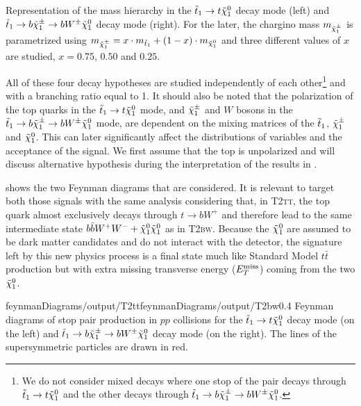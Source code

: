                  {Representation of the mass hierarchy in the $\tilde{t}_1 \rightarrow t
                 \tilde{\chi}_1^0$ decay mode (left) and $\tilde{t}_1 \rightarrow b
                 \tilde{\chi}_1^\pm \rightarrow b W^{\pm} \tilde{\chi}_1^0 $ decay mode (right).
                 For the later, the chargino mass $m_{\tilde{\chi}_1^\pm}$ is
                 parametrized using $m_{\tilde{\chi}_1^\pm} = x \cdot m_{\tilde{t}_1}
                 + (1 - x) \cdot m_{\tilde{\chi}_1^0}$ and three different values of $x$
                 are studied, $x = 0.75$, $0.50$ and $0.25$.}

    All of these four decay hypotheses are studied independently
    of each other\footnote{We do not consider mixed decays where one stop of the pair
    decays through $\tilde{t}_1 \rightarrow t \tilde{\chi}_1^0$ and the other decays through
    $\tilde{t}_1 \rightarrow b \tilde{\chi}_1^\pm \rightarrow b W^{\pm} \tilde{\chi}_1^0$.} and with a
    branching ratio equal to 1. It should also be noted that the polarization of the
    top quarks in the $\tilde{t}_1 \rightarrow t \tilde{\chi}_1^0$ mode, and $\tilde{\chi}_1^\pm$ and
    $W$ bosons in the $\tilde{t}_1 \rightarrow b \tilde{\chi}_1^\pm \rightarrow b W^{\pm}
    \tilde{\chi}_1^0$ mode, are dependent on the mixing matrices of the $\tilde{t}_1$, $\tilde{\chi}_1^\pm$
    and $\tilde{\chi}_1^0$. This can later significantly affect the distributions of
    variables and the acceptance of the signal. We first assume that the top is unpolarized
    and will discuss alternative hypothesis during the interpretation of the results in
    .

     shows the two Feynman diagrams that are
    considered. It is relevant to target both those signals with the same analysis
    considering that, in \textsc{T2tt}, the top quark almost exclusively decays
    through $t \rightarrow b W^+$ and therefore lead to the same intermediate state
    $b \bar{b} W^+ W^- + \tilde{\chi}_1^0 \tilde{\chi}_1^0$ as in \textsc{T2bw}. Because the
    $\tilde{\chi}_1^0$ are assumed to be dark matter candidates and do not interact with
    the detector, the signature left by this new physics process is a final state much
    like Standard Model $t\bar{t}$ production but with extra missing transverse energy
    ($E_T^\text{miss}$) coming from the two $\tilde{\chi}_1^0$.

                     {feynmanDiagrams/output/T2tt}{feynmanDiagrams/output/T2bw}{0.4}
                     {Feynman diagrams of stop pair production in $pp$ collisions for the
                     $\tilde{t}_1 \rightarrow t \tilde{\chi}_1^0$ decay mode (on the left) and
                     $\tilde{t}_1 \rightarrow b \tilde{\chi}_1^\pm \rightarrow b W^{\pm} \tilde{\chi}_1^0$ decay mode
                     (on the right). The lines of the supersymmetric particles are drawn in red.}

